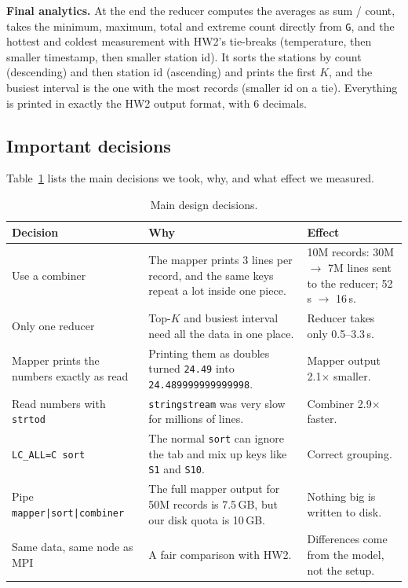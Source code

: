 \documentclass[10pt,a4paper]{article}
\newcommand{\code}[1]{\texttt{#1}}
\begin{document}
\textbf{Final analytics.} At the end the reducer computes the averages as sum / count, takes the minimum, maximum, total and
extreme count directly from \code{G}, and the hottest and coldest measurement with HW2's tie-breaks (temperature, then smaller
timestamp, then smaller station id). It sorts the stations by count (descending) and then station id (ascending) and prints the
first $K$, and the busiest interval is the one with the most records (smaller id on a tie). Everything is printed in exactly the
HW2 output format, with 6 decimals.

\subsection{Important decisions}
Table~\ref{tab:decisions} lists the main decisions we took, why, and what effect we measured.

\begin{table}[!htbp]
\centering\small
\begin{tabularx}{\textwidth}{>{\raggedright\arraybackslash}p{3.8cm}>{\raggedright\arraybackslash}X>{\raggedright\arraybackslash}p{4.2cm}}
\toprule
Decision & Why & Effect \\
\midrule
Use a combiner & The mapper prints 3 lines per record, and the same keys repeat a lot inside one piece. & 10M records: 30M $\to$ 7M lines sent to the reducer; 52\,s $\to$ 16\,s. \\
Only one reducer & Top-$K$ and busiest interval need all the data in one place. & Reducer takes only 0.5--3.3\,s. \\
Mapper prints the numbers exactly as read & Printing them as doubles turned \code{24.49} into \code{24.489999999999998}. & Mapper output 2.1$\times$ smaller. \\
Read numbers with \code{strtod} & \code{stringstream} was very slow for millions of lines. & Combiner 2.9$\times$ faster. \\
\code{LC\_ALL=C sort} & The normal \code{sort} can ignore the tab and mix up keys like \code{S1} and \code{S10}. & Correct grouping. \\
Pipe \code{mapper|sort|combiner} & The full mapper output for 50M records is 7.5\,GB, but our disk quota is 10\,GB. & Nothing big is written to disk. \\
Same data, same node as MPI & A fair comparison with HW2. & Differences come from the model, not the setup. \\
\bottomrule
\end{tabularx}
\caption{Main design decisions.}
\label{tab:decisions}
\end{table}
\end{document}
